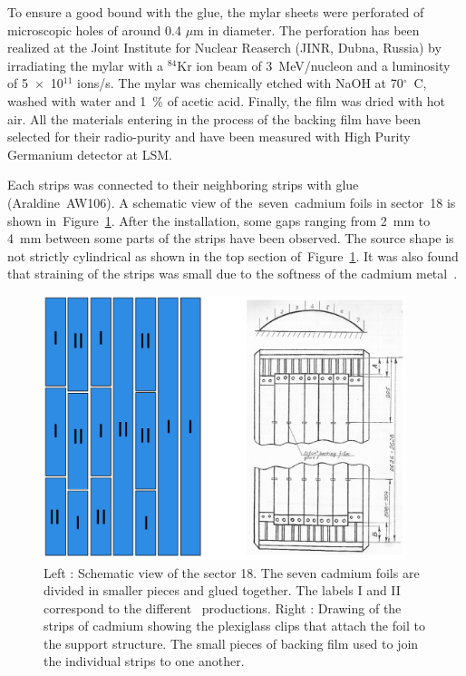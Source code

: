 \documentclass[main.tex]{subfiles}
\begin{document}
\bigskip


\NI To ensure a good bound with the glue, the mylar sheets were perforated of microscopic holes of around 0.4 $\mu$m in diameter. The perforation has been realized at the Joint Institute for Nuclear Reaserch (JINR, Dubna, Russia) by irradiating the mylar with a $^{\text{84}}$Kr ion beam of 3~MeV/nucleon and a luminosity of 5~$\times$~10$^{\text{11}}$ ions/s. The mylar was chemically etched with NaOH at 70$^{\circ}$~C, washed with water and 1~\% of acetic acid. Finally, the film was dried with hot air. All the materials entering in the process of the backing film have been selected for their radio-purity and have been measured with High Purity Germanium detector at LSM.


\bigskip


\NI Each strips was connected to their neighboring strips with glue (Araldine~AW106). A schematic view of the~seven~cadmium foils in sector~18 is shown in~Figure~\ref{CdFoil}. After the installation, some gaps ranging from 2~mm to 4~mm between some parts of the strips have been observed. The source shape is not strictly cylindrical as shown in the top section of~Figure~\ref{CdFoil}. It was also found that straining of the strips was small due to the softness of the cadmium metal~\cite{SoftnessCdMetal}. 


\bigskip


\begin{figure}[h!]
\includegraphics[height=7.7cm]{pictures/Chap6/schemaFoil_v2.pdf}
\centering
\caption{Left : Schematic view of the sector 18. The seven cadmium foils are divided in smaller pieces and glued together. The labels I and II correspond to the different \Cd~productions. Right : Drawing of the strips of cadmium showing the plexiglass clips that attach the foil to the support structure. The small pieces of backing film used to join the individual strips to one another.}
\label{CdFoil}
\end{figure}
\end{document}
